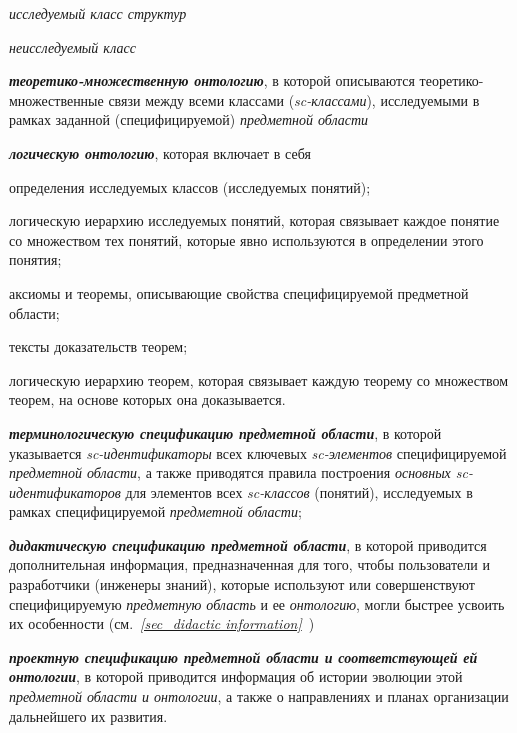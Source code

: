 \begin{textitemize}
\begin{textitemize}
\begin{textitemize}
			\item \textit{исследуемый класс структур\scnrolesign}
			\item \textit{неисследуемый класс\scnrolesign}
			\begin{SCn}
			\end{SCn}
		\end{textitemize}
		\item \textbf{\textit{теоретико-множественную онтологию}}, в которой описываются теоретико-множественные связи между всеми классами (\textit{sc-классами}), исследуемыми в рамках заданной (специфицируемой) \textit{предметной области}
		\item \textbf{\textit{логическую онтологию}}, которая включает в себя
		\begin{textitemize}
			\item определения исследуемых классов (исследуемых понятий);
			\item логическую иерархию исследуемых понятий, которая связывает каждое понятие со множеством тех понятий, которые явно используются в определении этого понятия;
			\item аксиомы и теоремы, описывающие свойства специфицируемой предметной области;
			\item тексты доказательств теорем;
			\item логическую иерархию теорем, которая связывает каждую теорему со множеством теорем, на основе которых она доказывается.
		\end{textitemize}
		\item \textbf{\textit{терминологическую спецификацию предметной области}}, в которой указывается \textit{sc-идентификаторы} всех ключевых \textit{sc-элементов} специфицируемой \textit{предметной области}, а также приводятся правила построения \textit{основных sc-идентификаторов} для элементов всех \textit{sc-классов} (понятий), исследуемых в рамках специфицируемой \textit{предметной области};
		\item \textbf{\textit{дидактическую спецификацию предметной области}}, в которой приводится дополнительная информация, предназначенная для того, чтобы пользователи и разработчики (инженеры знаний), которые используют или совершенствуют специфицируемую \textit{предметную область} и ее \textit{онтологию}, могли быстрее усвоить их особенности (см.~\textit{\ref{sec_didactic information}~})
		\item \textbf{\textit{проектную спецификацию предметной области и соответствующей ей онтологии}}, в которой приводится информация об истории эволюции этой \textit{предметной области и онтологии}, а также о направлениях и планах организации дальнейшего их развития.
	\end{textitemize}
\end{textitemize}	 

